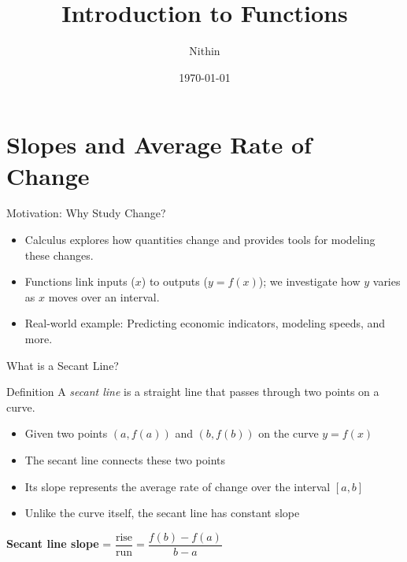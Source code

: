 \documentclass{beamer}
\title{Introduction to Functions}
\author{Nithin}
\institute{}
\date{\today}
\begin{document}
\begin{frame}
  \titlepage
\end{frame}
\begin{frame}
  \tableofcontents
\end{frame}
\section{Slopes and Average Rate of Change}

\begin{frame}{Motivation: Why Study Change?}
  \begin{itemize}
    \item Calculus explores how quantities change and provides tools for modeling these changes.
    \item Functions link inputs ($x$) to outputs ($y=f(x)$); we investigate how $y$ varies as $x$ moves over an interval.
    \item Real-world example: Predicting economic indicators, modeling speeds, and more.
  \end{itemize}
\end{frame}

\begin{frame}{What is a Secant Line?}
  \begin{block}{Definition}
    A \emph{secant line} is a straight line that passes through two points on a curve.
  \end{block}
  \begin{itemize}
    \item Given two points $(a,f(a))$ and $(b,f(b))$ on the curve $y=f(x)$
    \item The secant line connects these two points
    \item Its slope represents the average rate of change over the interval $[a,b]$
    \item Unlike the curve itself, the secant line has constant slope
  \end{itemize}
  \vspace{1ex}
  \begin{center}
    \textbf{Secant line slope} = $\dfrac{\text{rise}}{\text{run}} = \dfrac{f(b)-f(a)}{b-a}$
  \end{center}
\end{frame}
\end{document}
